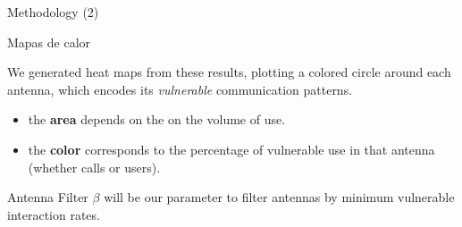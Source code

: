 \documentclass{beamer}
\begin{document}
\begin{frame}{Methodology (2)}
	
	
	\begin{block}{Mapas de calor}
		
		
		We generated heat maps from these results, plotting a colored circle around each antenna, which encodes its \textit{vulnerable} communication patterns.
		
			
		\begin{itemize}
			\item the \textbf{area} depends on the on the volume of use.
			\item the \textbf{color} corresponds to the percentage of vulnerable use in that antenna (whether calls or users).
		\end{itemize}
		
	\end{block}
	
	\begin{block}{Antenna Filter}
		$\beta$ will be our parameter to filter antennas by minimum vulnerable interaction rates. 
		

\end{block}
\end{frame}
\end{document}
